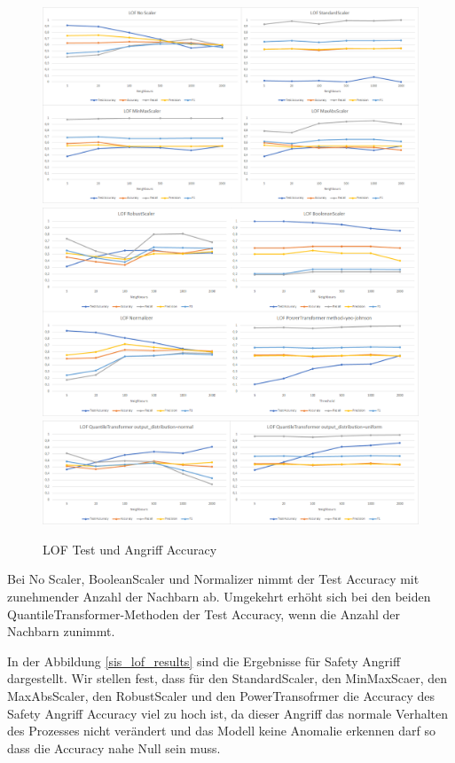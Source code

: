 \documentclass[12pt,a4paper]{scrartcl}
\numberwithin{equation}{section}
\begin{document}
\begin{figure}[ht!]
	\centering
	  \includegraphics[scale=0.5]{lof_1.png}
	  \includegraphics[scale=0.5]{lof_2.png}
	  \includegraphics[scale=0.5]{lof_3.png}
	  \caption{LOF Test und Angriff Accuracy}
	\label{lof_results}
\end{figure}

Bei No Scaler, BooleanScaler und Normalizer nimmt der Test Accuracy mit zunehmender Anzahl der Nachbarn ab. Umgekehrt erhöht sich bei den beiden QuantileTransformer-Methoden der Test Accuracy, wenn die Anzahl der Nachbarn zunimmt. 

In der Abbildung \ref{sis_lof_results} sind die Ergebnisse für Safety Angriff dargestellt. Wir stellen fest, dass für den StandardScaler, den MinMaxScaer, den MaxAbsScaler, den RobustScaler und den PowerTransofrmer die Accuracy des Safety Angriff Accuracy viel zu hoch ist, da dieser Angriff das normale Verhalten des Prozesses nicht verändert und das Modell keine Anomalie erkennen darf so dass die Accuracy nahe Null sein muss.
\end{document}

